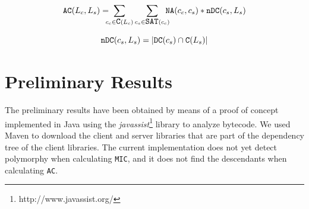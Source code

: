 \documentclass[a4paper]{article}
\begin{document}
\begin{equation*}
  \verb|AC|(L_c,L_s) = \!\!\!\!\sum_{c_c \in \verb|C|(L_c)} \sum_{c_s \in \verb|SAT|(c_c)} \!\!\!\!\verb|NA|(c_c, c_s)*\verb|nDC|(c_s, L_s)
\end{equation*}

\begin{equation*}
    \verb|nDC|(c_s, L_s) = |\verb|DC|(c_s) \cap \verb|C|(L_s)|
\end{equation*}

\section{Preliminary Results}
The preliminary results have been obtained by means of a proof of concept implemented in Java using the \textit{javassist}\footnote{http://www.javassist.org/} library to analyze  bytecode. We used Maven to download the client and server libraries that are part of the dependency tree of the client libraries. The current implementation does not yet detect polymorphy when calculating \texttt{MIC}, and it does not find the descendants when calculating \texttt{AC}.

\end{document}
